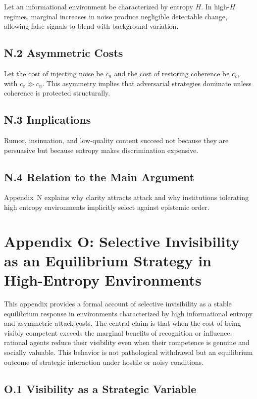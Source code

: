 \documentclass[11pt]{article}
\begin{document}
Let an informational environment be characterized by entropy \(H\). In high-\(H\) regimes, marginal increases in noise produce negligible detectable change, allowing false signals to blend with background variation.

\subsection{N.2 Asymmetric Costs}

Let the cost of injecting noise be \(c_n\) and the cost of restoring coherence be \(c_c\), with \(c_c \gg c_n\). This asymmetry implies that adversarial strategies dominate unless coherence is protected structurally.

\subsection{N.3 Implications}

Rumor, insinuation, and low-quality content succeed not because they are persuasive but because entropy makes discrimination expensive.

\subsection{N.4 Relation to the Main Argument}

Appendix~N explains why clarity attracts attack and why institutions tolerating high entropy environments implicitly select against epistemic order.

\section{Appendix O: Selective Invisibility as an Equilibrium Strategy in High-Entropy Environments}
\label{app:invisibility-detailed}

This appendix provides a formal account of selective invisibility as a stable equilibrium response in environments characterized by high informational entropy and asymmetric attack costs. The central claim is that when the cost of being visibly competent exceeds the marginal benefits of recognition or influence, rational agents reduce their visibility even when their competence is genuine and socially valuable. This behavior is not pathological withdrawal but an equilibrium outcome of strategic interaction under hostile or noisy conditions.

\subsection{O.1 Visibility as a Strategic Variable}
\end{document}
